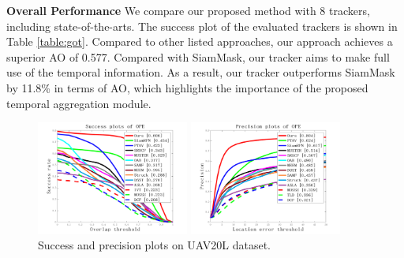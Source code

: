 \documentclass{article}
\begin{document}
\textbf{Overall Performance}
We compare our proposed method with 8 trackers, including state-of-the-arts.
The success plot of the evaluated trackers is shown in Table \ref{table:got}.
Compared to other listed approaches, our approach achieves a superior AO of 0.577.
Compared with SiamMask, our tracker aims to make full use of the temporal information. As a result, our tracker outperforms SiamMask by 11.8\% in terms of AO, which highlights the importance of the proposed temporal aggregation module.

\begin{figure}[t]
\begin{minipage}[b]{.48\linewidth}
  \centering
  \centerline{\includegraphics[width=5.0cm]{images/quality_plot_overlap_OPE_AUC.png}}
\end{minipage}
\hfill
\begin{minipage}[b]{0.48\linewidth}
  \centering
  \centerline{\includegraphics[width=5.0cm]{images/quality_plot_error_OPE_threshold.png}}
\end{minipage}
\vspace{-5mm}
%
\caption{Success and precision plots on UAV20L dataset.}
\vspace{-3mm}
\label{fig:uav20l}
%
\end{figure}
\vspace{-2mm}
\end{document}
